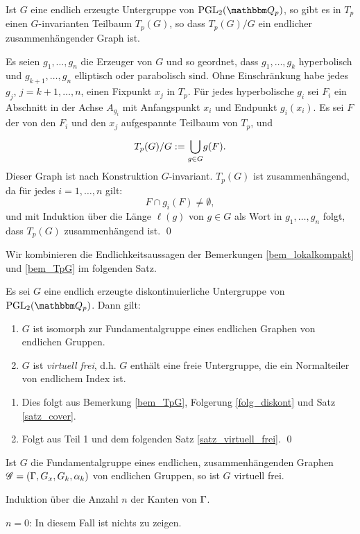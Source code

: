 \documentclass[a4paper, 12pt, twoside]{article}
\begin{document}
\BEM\label{bem_TpG}
Ist $G$ eine endlich erzeugte Untergruppe von $\PGL_2(\QQ_p)$,
so gibt es in $T_p$ einen $G$-invarianten Teilbaum $T_p(G)$, so dass
$T_p(G)/G$ ein endlicher zusammenhängender Graph ist.

\bew Es seien $g_1,\ldots, g_n$ die Erzeuger von $G$ und so geordnet,
dass $g_1,\ldots,g_k$ hyperbolisch und $g_{k+1},\ldots,g_n$
elliptisch oder parabolisch sind.
Ohne Einschränkung habe jedes $g_j$, $j=k+1,\ldots,n$, einen Fixpunkt
$x_j$ in $T_p$.
Für jedes hyperbolische $g_i$ sei $F_i$ ein Abschnitt in der Achse
$A_{g_i}$ mit Anfangspunkt $x_i$ und Endpunkt $g_i(x_i)$.
Es sei $F$ der von den $F_i$ und den $x_j$ aufgespannte Teilbaum
von $T_p$, und
\[
T_p(G)/G := \overset{}{\underset{g\in G}{\mathop{\bigcup}}} g(F).
\]
Dieser Graph ist nach Konstruktion $G$-invariant.
$T_p(G)$ ist zusammenhängend, da für jedes $i=1,\ldots,n$ gilt:
\[
F \cap g_i(F) \neq \emptyset,
\]
und mit Induktion über die Länge $\ell(g)$ von $g\in G$ als Wort in
$g_1,\ldots,g_n$ folgt, dass $T_p(G)$ zusammenhängend ist.
\qed

Wir kombinieren die Endlichkeitsaussagen der Bemerkungen
\ref{bem_lokalkompakt} und \ref{bem_TpG} im folgenden Satz.

\SATZ Es sei $G$ eine endlich erzeugte diskontinuierliche
Untergruppe von $\PGL_2(\QQ_p)$. Dann gilt:
\begin{enumerate}
\item $G$ ist isomorph zur Fundamentalgruppe eines endlichen Graphen
von endlichen Gruppen.
\item $G$ ist \emph{virtuell frei},
d.h. $G$ enthält eine
freie Untergruppe, die ein Normalteiler von endlichem Index ist.
\end{enumerate}
\bew
\begin{enumerate}
\item Dies folgt aus Bemerkung \ref{bem_TpG}, Folgerung
\ref{folg_diskont} und Satz \ref{satz_cover}.
\item Folgt aus Teil 1 und dem folgenden Satz
\ref{satz_virtuell_frei}.
\qed
\end{enumerate}

\SATZ \label{satz_virtuell_frei}
Ist $G$ die Fundamentalgruppe eines endlichen, zusammenhängenden
Graphen $\mathscr{G}=(\Gamma,G_x,G_k,\alpha_k)$ von endlichen Gruppen, so ist $G$
virtuell frei.

\bew Induktion über die Anzahl $n$ der Kanten von $\Gamma$.

$n=0$: In diesem Fall ist nichts zu zeigen.
\end{document}
